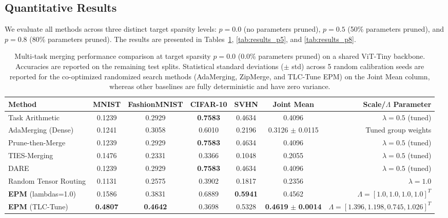 \subsection{Quantitative Results}

We evaluate all methods across three distinct target sparsity levels: $p=0.0$ (no parameters pruned), $p=0.5$ (50\% parameters pruned), and $p=0.8$ (80\% parameters pruned). The results are presented in Tables~\ref{tab:results_p0}, \ref{tab:results_p5}, and \ref{tab:results_p8}.

\begin{table}[t]
\caption{Multi-task merging performance comparison at target sparsity $p=0.0$ (0.0\% parameters pruned) on a shared ViT-Tiny backbone. Accuracies are reported on the remaining test splits. Statistical standard deviations ($\pm$ std) across 5 random calibration seeds are reported for the co-optimized randomized search methods (AdaMerging, ZipMerge, and TLC-Tune EPM) on the Joint Mean column, whereas other baselines are fully deterministic and have zero variance.}
\label{tab:results_p0}
\vskip 0.15in
\begin{center}
\begin{small}
\begin{sc}
\begin{tabular}{lcccccr}
\toprule
Method & MNIST & FashionMNIST & CIFAR-10 & SVHN & Joint Mean & Scale/$\Lambda$ Parameter \\
\midrule
Task Arithmetic  & 0.1239 & 0.2929 & \textbf{0.7583} & 0.4634 & 0.4096 & $\lambda=0.5$ (tuned) \\
AdaMerging (Dense) & 0.1241 & 0.3058 & 0.6010 & 0.2196 & 0.3126 $\pm$ 0.0115 & Tuned group weights \\
Prune-then-Merge & 0.1239 & 0.2929 & \textbf{0.7583} & 0.4634 & 0.4096 & $\lambda=0.5$ (tuned) \\
TIES-Merging     & 0.1476 & 0.2331 & 0.3366 & 0.1048 & 0.2055 & $\lambda=0.5$ (tuned) \\
DARE             & 0.1239 & 0.2929 & \textbf{0.7583} & 0.4634 & 0.4096 & $\lambda=0.5$ (tuned) \\
Random Tensor Routing & 0.1131 & 0.2575 & 0.3902 & 0.1817 & 0.2356 & $\lambda=1.0$ \\
\midrule
\textbf{EPM} (lambdas=1.0) & 0.1586 & 0.3831 & 0.6889 & \textbf{0.5941} & 0.4562 & $\Lambda=[1.0, 1.0, 1.0, 1.0]^T$ \\
\textbf{EPM} (TLC-Tune)    & \textbf{0.4807} & \textbf{0.4642} & 0.3698 & 0.5328 & \textbf{0.4619} $\pm$ \textbf{0.0014} & $\Lambda=[1.396, 1.198, 0.745, 1.026]^T$ \\
\bottomrule
\end{tabular}
\end{sc}
\end{small}
\end{center}
\vskip -0.1in
\end{table}

